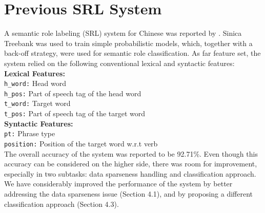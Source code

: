 \documentclass[11pt]{article}
\begin{document}
\section{Previous SRL System}
A semantic role labeling (SRL) system for Chinese was reported by \cite{you-chen:2004}. Sinica Treebank was used to train simple probabilistic models, which, together with a back-off strategy, were used for semantic role classification. As far feature set, the system relied on the following conventional lexical and syntactic features:\\[0.2cm]
\textbf{Lexical Features:}\\
\verb+h_word:+ Head word\\ 
\verb+h_pos:+ Part of speech tag of the head word\\ 
\verb+t_word:+ Target word\\ 
\verb+t_pos:+ Part of speech tag of the target word\\[0.2cm]
\textbf{Syntactic Features:} \\ \verb+pt:+ Phrase type\\ 
\verb+position:+ Position of the target word w.r.t verb  \\[0.2cm]
The overall accuracy of the system was reported to be 92.71\%. Even though this accuracy can be considered on the higher side, there was room for improvement, especially in two subtasks: data sparseness handling and classification approach. We have considerably improved the performance of the system by better addressing the data sparseness issue (Section 4.1), and by proposing a different classification approach (Section 4.3). 
\end{document}
